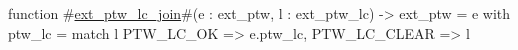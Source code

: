 function #\hyperref[sailRISCVzextzyptwzylczyjoin]{ext\_ptw\_lc\_join}#(e : ext_ptw, l : ext_ptw_lc) -> ext_ptw =
  { e with ptw_lc =
      match l {
        PTW_LC_OK => e.ptw_lc,
        PTW_LC_CLEAR => l
      }
  }
